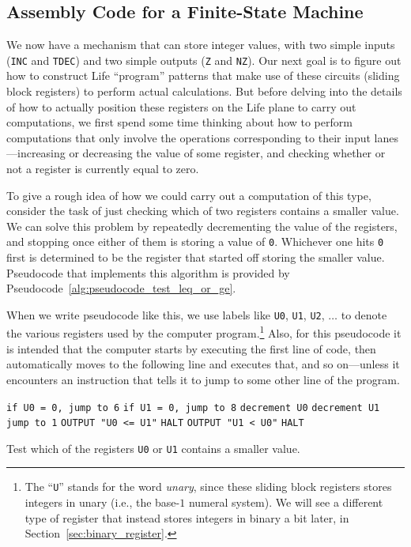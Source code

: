 \subsection{Assembly Code for a Finite-State Machine}\label{sec:finite_state_machine}

We now have a mechanism that can store integer values, with two simple inputs (\texttt{INC} and \texttt{TDEC}) and two simple outputs (\texttt{Z} and \texttt{NZ}). Our next goal is to figure out how to construct Life ``program'' patterns that make use of these circuits (sliding block registers) to perform actual calculations. But before delving into the details of how to actually position these registers on the Life plane to carry out computations, we first spend some time thinking about how to perform computations that only involve the operations corresponding to their input lanes---increasing or decreasing the value of some register, and checking whether or not a register is currently equal to zero.

To give a rough idea of how we could carry out a computation of this type, consider the task of just checking which of two registers contains a smaller value. We can solve this problem by repeatedly decrementing the value of the registers, and stopping once either of them is storing a value of \texttt{0}. Whichever one hits \texttt{0} first is determined to be the register that started off storing the smaller value. Pseudocode that implements this algorithm is provided by Pseudocode~\ref{alg:pseudocode_test_leq_or_ge}.

When we write pseudocode like this, we use labels like \texttt{U0}, \texttt{U1}, \texttt{U2}, $\ldots$ to denote the various registers used by the computer program.\footnote{The ``\texttt{U}'' stands for the word \emph{unary}, since these sliding block registers stores integers in unary (i.e., the base-$1$ numeral system). We will see a different type of register that instead stores integers in binary a bit later, in Section~\ref{sec:binary_register}.} Also, for this pseudocode it is intended that the computer starts by executing the first line of code, then automatically moves to the following line and executes that, and so on---unless it encounters an instruction that tells it to jump to some other line of the program.

\begin{pseudocode}[!htb]
	\begin{algorithmic}[1]\small
		\State \texttt{if U0 = 0, jump to 6}
		\State \texttt{if U1 = 0, jump to 8}
		\State \texttt{decrement U0}
		\State \texttt{decrement U1}
		\State \texttt{jump to 1}
		\State \texttt{OUTPUT "U0 <= U1"}
		\State \texttt{HALT}
		\State \texttt{OUTPUT "U1 < U0"}
		\State \texttt{HALT}
	\end{algorithmic}
	\caption{Test which of the registers \texttt{U0} or \texttt{U1} contains a smaller value.}\label{alg:pseudocode_test_leq_or_ge}
\end{pseudocode}

